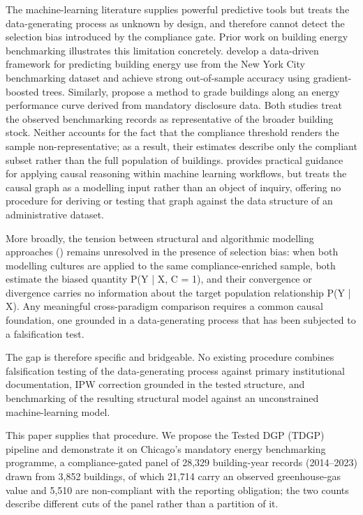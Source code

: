 The machine-learning literature supplies powerful predictive tools but treats the data-generating process as unknown by design, and therefore cannot detect the selection bias introduced by the compliance gate. Prior work on building energy benchmarking illustrates this limitation concretely.  develop a data-driven framework for predicting building energy use from the New York City benchmarking dataset and achieve strong out-of-sample accuracy using gradient-boosted trees. Similarly,  propose a method to grade buildings along an energy performance curve derived from mandatory disclosure data. Both studies treat the observed benchmarking records as representative of the broader building stock. Neither accounts for the fact that the compliance threshold renders the sample non-representative; as a result, their estimates describe only the compliant subset rather than the full population of buildings.  provides practical guidance for applying causal reasoning within machine learning workflows, but treats the causal graph as a modelling input rather than an object of inquiry, offering no procedure for deriving or testing that graph against the data structure of an administrative dataset.

More broadly, the tension between structural and algorithmic modelling approaches () remains unresolved in the presence of selection bias: when both modelling cultures are applied to the same compliance-enriched sample, both estimate the biased quantity P(Y | X, C = 1), and their convergence or divergence carries no information about the target population relationship P(Y | X). Any meaningful cross-paradigm comparison requires a common causal foundation, one grounded in a data-generating process that has been subjected to a falsification test.

The gap is therefore specific and bridgeable. No existing procedure combines falsification testing of the data-generating process against primary institutional documentation, IPW correction grounded in the tested structure, and benchmarking of the resulting structural model against an unconstrained machine-learning model.

This paper supplies that procedure. We propose the Tested DGP (TDGP) pipeline and demonstrate it on Chicago's mandatory energy benchmarking programme, a compliance-gated panel of 28,329 building-year records (2014--2023) drawn from 3,852 buildings, of which 21,714 carry an observed greenhouse-gas value and 5,510 are non-compliant with the reporting obligation; the two counts describe different cuts of the panel rather than a partition of it.

